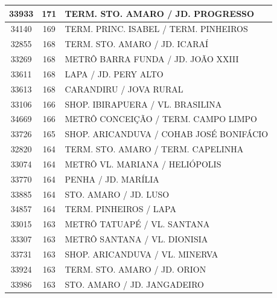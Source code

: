 \documentclass[
	12pt,				%
	oneside,			%
	a4paper,			%
	english,			%
	brazil				%
	]{abntex2ppgsi}
\begin{document}
{{\begin{apendicesenv}
\begin{longtable}{c|c|p{7cm}}
    33933 & 171   & TERM. STO. AMARO / JD. PROGRESSO \\
\hline

    34140 & 169   & TERM. PRINC. ISABEL / TERM. PINHEIROS \\
\hline

    32855 & 168   & TERM. STO. AMARO / JD. ICARAÍ \\
\hline

    33269 & 168   & METRÔ BARRA FUNDA / JD. JOÃO XXIII \\
\hline

    33611 & 168   & LAPA / JD. PERY ALTO \\
\hline

    33613 & 168   & CARANDIRU / JOVA RURAL \\
\hline

    33106 & 166   & SHOP. IBIRAPUERA / VL. BRASILINA \\
\hline

    34669 & 166   & METRÔ CONCEIÇÃO / TERM. CAMPO LIMPO \\
\hline

    33726 & 165   & SHOP. ARICANDUVA / COHAB JOSÉ BONIFÁCIO  \\
\hline

    32820 & 164   & TERM. STO. AMARO / TERM. CAPELINHA \\
\hline

    33074 & 164   & METRÔ VL. MARIANA / HELIÓPOLIS \\
\hline

    33770 & 164   & PENHA / JD. MARÍLIA \\
\hline

    33885 & 164   & STO. AMARO / JD. LUSO \\
\hline

    34857 & 164   & TERM. PINHEIROS / LAPA \\
\hline

    33015 & 163   & METRÔ TATUAPÉ / VL. SANTANA \\
\hline

    33307 & 163   & METRÔ SANTANA / VL. DIONISIA \\
\hline

    33731 & 163   & SHOP. ARICANDUVA / VL. MINERVA \\
\hline

    33924 & 163   & TERM. STO. AMARO / JD. ORION \\
\hline

    33986 & 163   & STO. AMARO / JD. JANGADEIRO \\
\hline


\end{longtable}
\end{apendicesenv}}}
\end{document}
